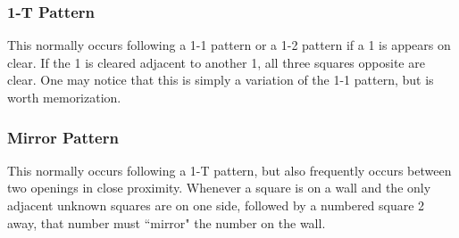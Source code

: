 \subsubsection*{1-T Pattern}
This normally occurs following a 1-1 pattern or a 1-2 pattern if a 1 is appears on clear. If the 1 is cleared adjacent to another 1, all three squares opposite are clear. One may notice that this is simply a variation of the 1-1 pattern, but is worth memorization.\\


\subsubsection*{Mirror Pattern}
This normally occurs following a 1-T pattern, but also frequently occurs between two openings in close proximity. Whenever a square is on a wall and the only adjacent unknown squares are on one side, followed by a numbered square 2 away, that number must ``mirror" the number on the wall.


